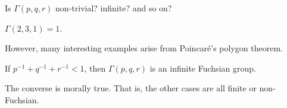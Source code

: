\documentclass{article}
\begin{document}
Is \(\Gamma(p,q,r)\) non-trivial? infinite? and so on?

\begin{example}
    \(\Gamma(2,3,1) = 1\).
\end{example}

However, many interesting examples arise from Poincar\'e's polygon theorem.

\begin{theorem}
     If \(p^{-1} + q^{-1} + r^{-1} < 1\), then \(\Gamma(p, q, r)\) is an infinite Fuchsian group.
\end{theorem}

\begin{remark}
    The converse is morally true. That is, the other cases are all finite or non-Fuchsian.
\end{remark}
\end{document}
